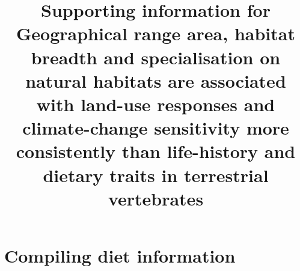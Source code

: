 \documentclass[11pt]{article}
\begin{document}
\title{\textbf{Supporting information for\\
\vspace{1cm}
Geographical range area, habitat breadth and specialisation on natural habitats are associated with land-use responses and climate-change sensitivity more consistently than life-history and dietary traits in terrestrial vertebrates   \vspace{2cm}}}


\maketitle
\clearpage

\section{Compiling diet information}

 
\end{document}
